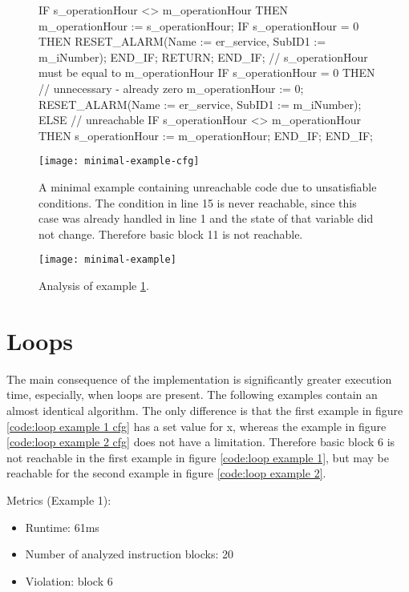 \begin{figure}[h!]
	\begin{GenericCode}
		IF s_operationHour <> m_operationHour THEN
			m_operationHour := s_operationHour;
			IF s_operationHour = 0 THEN
				RESET_ALARM(Name := er_service, SubID1 := m_iNumber);
			END_IF;
			RETURN;
		END_IF;
		// s_operationHour must be equal to m_operationHour
		IF s_operationHour = 0 THEN
			// unnecessary - already zero
			m_operationHour := 0;
			RESET_ALARM(Name := er_service, SubID1 := m_iNumber);
		ELSE
			// unreachable
			IF s_operationHour <> m_operationHour THEN
				s_operationHour := m_operationHour;
			END_IF;
		END_IF;	\end{GenericCode}
	\centering

	\texttt{[image: minimal-example-cfg]}
	\caption{A minimal example containing unreachable code due to unsatisfiable conditions. The condition in line 15 is never reachable, since this case was already handled in line 1 and the state of that variable did not change. Therefore basic block 11 is not reachable.}
	\label{code:basic example 1 cfg}
\end{figure}

\begin{figure}[h!]
	\centering
	\texttt{[image: minimal-example]}
	\caption{Analysis of example \ref{code:basic example 1 cfg}. }
	\label{code:basic example 1}
\end{figure}

\section{Loops}
The main consequence of the implementation is significantly greater execution time, especially, when loops are present.
The following examples contain an almost identical algorithm. The only difference is that the first example in figure \ref{code:loop example 1 cfg} has a set value for x, whereas the example in figure \ref{code:loop example 2 cfg} does not have a limitation. Therefore basic block 6 is not reachable in the first example in figure \ref{code:loop example 1}, but may be reachable for the second example in figure \ref{code:loop example 2}.


Metrics (Example 1):
\begin{itemize}
	\item Runtime: 61ms
	\item Number of analyzed instruction blocks: 20
	\item Violation: block 6
\end{itemize}



